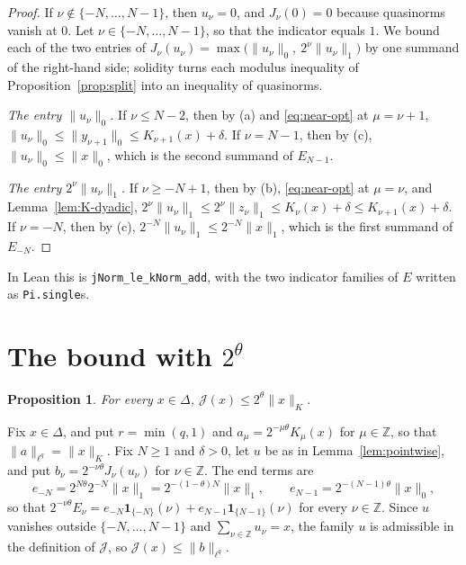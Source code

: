 \documentclass[11pt]{article}
\newtheorem{proposition}[theorem]{Proposition}
\theoremstyle{definition}
\theoremstyle{remark}
\newcommand{\norm}[2]{\lVert #1\rVert_{#2}}
\newcommand{\cJ}{\mathcal J}
\newcommand{\Z}{\mathbb Z}
\newcommand{\one}{\mathbf 1}
\begin{document}
\begin{proof}
  If \(\nu \notin \{-N, \dots, N-1\}\), then \(u_\nu = 0\), and \(J_\nu(0) = 0\) because
  quasinorms vanish at \(0\). Let \(\nu \in \{-N, \dots, N-1\}\), so that the indicator
  equals \(1\). We bound each of the two entries of
  \(J_\nu(u_\nu) = \max\bigl(\norm{u_\nu}{0},\ 2^\nu\norm{u_\nu}{1}\bigr)\) by one summand of the
  right-hand side; solidity turns each modulus inequality of Proposition~\ref{prop:split}
  into an inequality of quasinorms.

  \emph{The entry \(\norm{u_\nu}{0}\).} If \(\nu \le N-2\), then by (a) and
  \eqref{eq:near-opt} at \(\mu = \nu+1\),
  \(\norm{u_\nu}{0} \le \norm{y_{\nu+1}}{0} \le K_{\nu+1}(x) + \delta\).
  If \(\nu = N-1\), then by (c), \(\norm{u_\nu}{0} \le \norm{x}{0}\), which is the second
  summand of \(E_{N-1}\).

  \emph{The entry \(2^\nu \norm{u_\nu}{1}\).} If \(\nu \ge -N+1\), then by (b),
  \eqref{eq:near-opt} at \(\mu = \nu\), and Lemma~\ref{lem:K-dyadic},
  \(2^\nu\norm{u_\nu}{1} \le 2^\nu\norm{z_\nu}{1} \le K_\nu(x) + \delta \le K_{\nu+1}(x) +
  \delta\). If \(\nu = -N\), then by (c), \(2^{-N}\norm{u_\nu}{1} \le 2^{-N}\norm{x}{1}\),
  which is the first summand of \(E_{-N}\).
\end{proof}

In Lean this is \texttt{jNorm\_le\_kNorm\_add}, with the two indicator families of \(E\)
written as \texttt{Pi.single}s.

\section{The bound with \(2^\theta\)}

\begin{proposition}\label{prop:two-theta}
  For every \(x \in \Delta\), \(\cJ(x) \le 2^\theta \norm{x}{K}\).
\end{proposition}

Fix \(x \in \Delta\), and put \(r = \min(q,1)\) and
\(a_\mu = 2^{-\mu\theta} K_\mu(x)\) for \(\mu \in \Z\), so that
\(\norm{a}{\ell^q} = \norm{x}{K}\). Fix \(N \ge 1\) and \(\delta > 0\), let \(u\) be as in
Lemma~\ref{lem:pointwise}, and put \(b_\nu = 2^{-\nu\theta} J_\nu(u_\nu)\) for \(\nu \in \Z\).
The end terms are
\[
  e_{-N} = 2^{N\theta} 2^{-N}\norm{x}{1} = 2^{-(1-\theta)N}\norm{x}{1},
  \qquad
  e_{N-1} = 2^{-(N-1)\theta}\norm{x}{0},
\]
so that \(2^{-\nu\theta}E_\nu = e_{-N}\one_{\{-N\}}(\nu) + e_{N-1}\one_{\{N-1\}}(\nu)\) for
every \(\nu \in \Z\).
Since \(u\) vanishes outside \(\{-N, \dots, N-1\}\) and \(\sum_{\nu \in \Z} u_\nu = x\), the
family \(u\) is admissible in the definition of \(\cJ\), so \(\cJ(x) \le \norm{b}{\ell^q}\).
\end{document}

